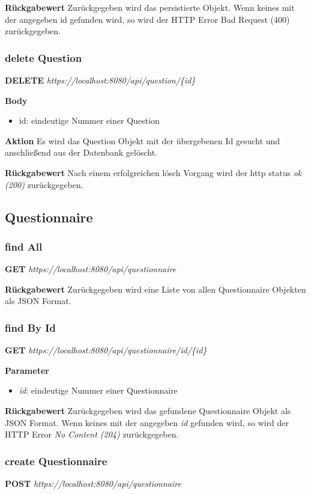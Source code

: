 \textbf{Rückgabewert}
Zurückgegeben wird das persistierte Objekt. Wenn keines mit der angegeben id gefunden wird, so wird der HTTP Error Bad Request
(400) zurückgegeben.

\subsubsection{delete Question}
\textbf{DELETE} \emph{https://localhost:8080/api/question/\{id\}}

\textbf{Body}
\begin{itemize}
    \item id: eindeutige Nummer einer Question
\end{itemize}

\textbf{Aktion}
Es wird das Question Objekt mit der übergebenen Id gesucht und anschließend
aus der Datenbank gelöscht.

\textbf{Rückgabewert}
Nach einem erfolgreichen lösch Vorgang wird der http status \emph{ok (200)} zurückgegeben.

\subsection{Questionnaire}
\subsubsection{find All}
\textbf{GET} \emph{https://localhost:8080/api/questionnaire}

\textbf{Rückgabewert}
Zurückgegeben wird eine Liste von allen Questionnaire Objekten als JSON
Format.

\subsubsection{find By Id}
\textbf{GET} \emph{https://localhost:8080/api/questionnaire/id/\{id\}}

\textbf{Parameter}
\begin{itemize}
    \item \emph{id}: eindeutige Nummer einer Questionnaire
\end{itemize}

\textbf{Rückgabewert}
Zurückgegeben wird das gefundene Questionnaire Objekt als JSON Format. Wenn keines mit der angegeben \emph{id} gefunden wird, so wird der
HTTP Error \emph{No Content (204)} zurückgegeben.

\subsubsection{create Questionnaire}
\textbf{POST} \emph{https://localhost:8080/api/questionnaire}

